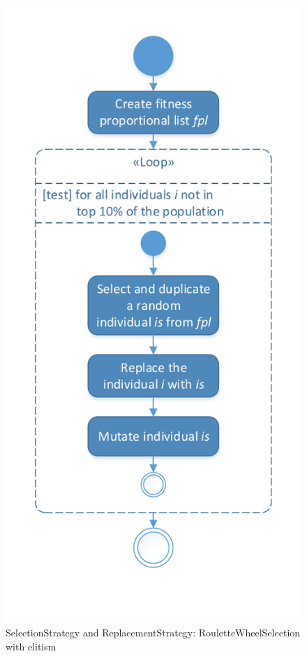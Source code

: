\begin{figure}[!ht]
	\centering
	\includegraphics[scale=0.7, trim=0cm 1.5cm 0cm 0.5cm, clip=true]{Images/SelectionAndReplacement_Roulette.pdf} 
	\caption{\Gls{SelectionStrategy} and \gls{ReplacementStrategy}: \Gls{RouletteWheelSelection} with elitism}
	\label{figSelectionAndReplacement_Roulette}
\end{figure}

